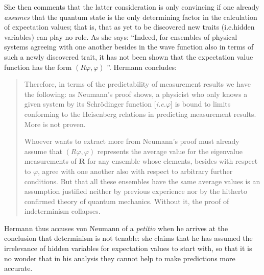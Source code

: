 \documentclass[12pt]{article}
\begin{document}
She then comments that the latter consideration is only convincing if one already \emph{assumes} that the quantum state is the only determining factor in the calculation of expectation values; that is, that as yet to be discovered new traits (i.e.\@ hidden variables) can play no role. As she says: ``Indeed, for ensembles of physical systems agreeing with one another besides in the wave function also in terms of such a newly discovered trait, it has not been shown that the expectation value function has the form $(R\varphi, \varphi)$ \cite[p.\@ 251]{crull}''.
Hermann concludes:
\begin{quote}
Therefore, in terms of the predictability of measurement results we have the following: as Neumann's proof shows, a physicist who only knows a given system by its Schr\"{o}dinger function [\emph{i.e.\@ $\varphi$}] is bound to limits conforming to the Heisenberg relations in predicting measurement results. More is not proven.

Whoever wants to extract more from Neumann's proof must already assume that $(R\varphi, \varphi)$ represents the average value for the eigenvalue measurements of $\textbf{R}$ for any ensemble whose elements, besides with respect to $\varphi$, agree with one another also with respect to arbitrary further conditions. But that all these ensembles have the same average values is an assumption justified neither by previous experience nor by the hitherto confirmed theory of quantum mechanics. Without it, the proof of indeterminism collapses.
\end{quote}


Hermann thus accuses von Neumann of a \emph{petitio} when he arrives at the conclusion that determinism is not tenable: she claims that he has assumed the irrelevance of hidden variables for expectation values to start with, so that it is no wonder that in his analysis they cannot help to make predictions more accurate.
\end{document}
